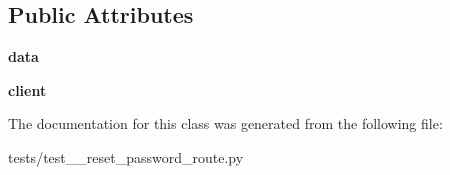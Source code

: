 \subsection*{Public Attributes}
\begin{DoxyCompactItemize}
\item 
\mbox{\label{classtests_1_1test__7__reset__password__route_1_1_test_user_routes_a8bf6fd6a2e472f20c5f0339f7d3caf06}} 
{\bfseries data}
\item 
\mbox{\label{classtests_1_1test__7__reset__password__route_1_1_test_user_routes_a8178f35f50d916908afb4acc6896a8fb}} 
{\bfseries client}
\end{DoxyCompactItemize}


The documentation for this class was generated from the following file\+:\begin{DoxyCompactItemize}
\item 
tests/test\+\_\+\_\+reset\+\_\+password\+\_\+route.\+py\end{DoxyCompactItemize}

